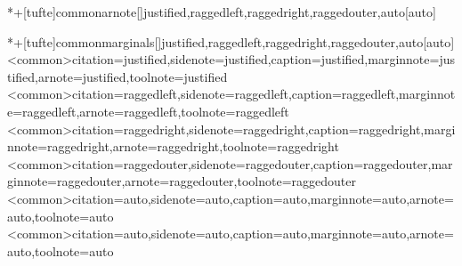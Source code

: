 
\newcommand*{\@tufte@toolnote@justification}{\@tufte@justification@autodetect}
+[tufte]{common}{arnote}[\@tufte@kvtext\@tufte@kvnum]{justified,raggedleft,raggedright,raggedouter,auto}[auto]{%
  \ifcase\@tufte@kvnum\relax
    \renewcommand*{\@tufte@toolnote@justification}{\justifying}%
  \or
    \renewcommand*{\@tufte@toolnote@justification}{\RaggedLeft}%
  \or
    \renewcommand*{\@tufte@toolnote@justification}{\RaggedRight}%
  \or
    \renewcommand*{\@tufte@toolnote@justification}{\@tufte@justification@outer}%
  \or
    \renewcommand*{\@tufte@toolnote@justification}{\@tufte@justification@autodetect}%
  \fi
}{%
  \renewcommand*{\@tufte@toolnote@justification}{\@tufte@justification@autodetect}%
}

+[tufte]{common}{marginals}[\@tufte@kvtext\@tufte@kvnum]{justified,raggedleft,raggedright,raggedouter,auto}[auto]{%
  \ifcase\@tufte@kvnum\relax
    \ExecuteOptionsX[tufte]<common>{citation=justified,sidenote=justified,caption=justified,marginnote=justified,arnote=justified,toolnote=justified}%
  \or
    \ExecuteOptionsX[tufte]<common>{citation=raggedleft,sidenote=raggedleft,caption=raggedleft,marginnote=raggedleft,arnote=raggedleft,toolnote=raggedleft}%
  \or
    \ExecuteOptionsX[tufte]<common>{citation=raggedright,sidenote=raggedright,caption=raggedright,marginnote=raggedright,arnote=raggedright,toolnote=raggedright}%
  \or
    \ExecuteOptionsX[tufte]<common>{citation=raggedouter,sidenote=raggedouter,caption=raggedouter,marginnote=raggedouter,arnote=raggedouter,toolnote=raggedouter}%
  \or
    \ExecuteOptionsX[tufte]<common>{citation=auto,sidenote=auto,caption=auto,marginnote=auto,arnote=auto,toolnote=auto}%
  \fi
}{%
  \ExecuteOptionsX[tufte]<common>{citation=auto,sidenote=auto,caption=auto,marginnote=auto,arnote=auto,toolnote=auto}%
}

